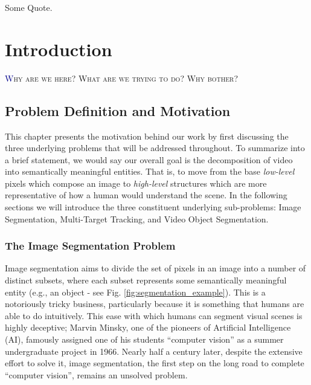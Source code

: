 \begin{savequote}[75mm]
Some Quote.
\end{savequote}


\chapter{Introduction}
\lettrine[lines=3, loversize=0.3]{\textcolor{DarkBlue}W}{hy are we here? What are we trying to do? Why bother?}

\section{Problem Definition and Motivation}
This chapter presents the motivation behind our work by first discussing the three underlying problems that will be addressed throughout. To summarize into a brief statement, we would say our overall goal is the decomposition of video into semantically meaningful entities. That is, to move from the base \emph{low-level} pixels which compose an image to \emph{high-level} structures which are more representative of how a human would understand the scene. In the following sections we will introduce the three constituent underlying sub-problems: Image Segmentation, Multi-Target Tracking, and Video Object Segmentation.

\subsection{The Image Segmentation Problem}
Image segmentation aims to divide the set of pixels in an image into a number of distinct subsets, where each subset represents some semantically meaningful entity (e.g., an object - see Fig. \ref{fig:segmentation_example}). This is a notoriously tricky business, particularly because it is something that humans are able to do intuitively. This ease with which humans can segment visual scenes is highly deceptive; Marvin Minsky, one of the pioneers of Artificial Intelligence (AI), famously assigned one of his students ``computer vision'' as a summer undergraduate project in 1966. Nearly half a century later, despite the extensive effort to solve it, image segmentation, the first step on the long road to complete ``computer vision'', remains an unsolved problem. 

